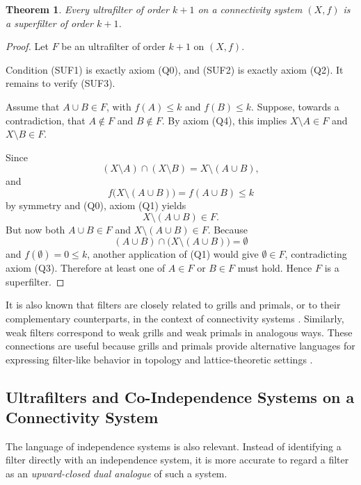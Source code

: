 \documentclass[10pt]{book}
\newtheorem{theorem}{Theorem}[section]
\theoremstyle{definition}
\begin{document}
\begin{theorem}
Every ultrafilter of order \(k+1\) on a connectivity system \((X,f)\) is a superfilter of order \(k+1\).
\end{theorem}

\begin{proof}
Let \(F\) be an ultrafilter of order \(k+1\) on \((X,f)\).

Condition (SUF1) is exactly axiom (Q0), and (SUF2) is exactly axiom (Q2).  
It remains to verify (SUF3).

Assume that \(A\cup B\in F\), with \(f(A)\leq k\) and \(f(B)\leq k\).  
Suppose, towards a contradiction, that \(A\notin F\) and \(B\notin F\).  
By axiom (Q4), this implies \(X\setminus A\in F\) and \(X\setminus B\in F\).

Since
\[
(X\setminus A)\cap (X\setminus B)=X\setminus (A\cup B),
\]
and
\[
f\bigl(X\setminus (A\cup B)\bigr)=f(A\cup B)\leq k
\]
by symmetry and (Q0), axiom (Q1) yields
\[
X\setminus (A\cup B)\in F.
\]
But now both \(A\cup B\in F\) and \(X\setminus (A\cup B)\in F\).  
Because
\[
(A\cup B)\cap \bigl(X\setminus (A\cup B)\bigr)=\emptyset
\]
and \(f(\emptyset)=0\leq k\), another application of (Q1) would give \(\emptyset\in F\), contradicting axiom (Q3).  
Therefore at least one of \(A\in F\) or \(B\in F\) must hold.  
Hence \(F\) is a superfilter.
\end{proof}

It is also known that filters are closely related to grills and primals, or to their complementary counterparts, in the context of connectivity systems \cite{FujitaGrill2024}.  
Similarly, weak filters correspond to weak grills and weak primals in analogous ways.  
These connections are useful because grills and primals provide alternative languages for expressing filter-like behavior in topology and lattice-theoretic settings \cite{thron1973proximity,matejdes2024induced,ibedou2023ideals,roy2007typical,karthik2014generalization,dolecki2003hyperconvergences}.

\subsection{Ultrafilters and Co-Independence Systems on a Connectivity System}

The language of independence systems is also relevant.  
Instead of identifying a filter directly with an independence system, it is more accurate to regard a filter as an \emph{upward-closed dual analogue} of such a system.
\end{document}
